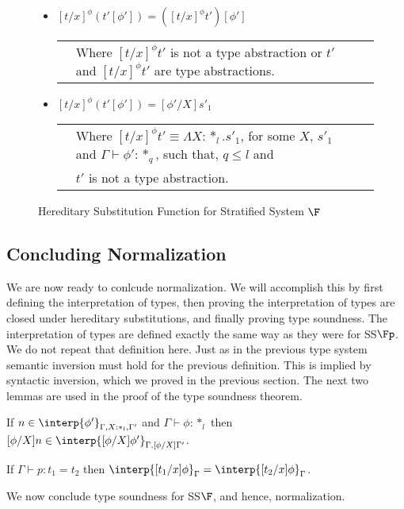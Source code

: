 \begin{figure}[t]
\begin{itemize}
  \item[] $[t/x]^\phi (t'[\phi']) = ([t/x]^\phi t')[\phi']$\\
    \begin{tabular}{lll}
      & Where $[t/x]^\phi t'$ is not a type abstraction or
      $t'$ and $[t/x]^\phi t'$ are type abstractions.
    \end{tabular}

    \item[] $[t/x]^{\phi} (t'[\phi']) = [\phi'/X]s'_1$\\
      \begin{tabular}{lll}
        & Where $[t/x]^{\phi} t' \equiv \Lambda X:*_l.s'_1$,
        for some $X$, $s'_1$ and $\Gamma \vdash \phi':*_q$, such that, $q \leq l$ and\\
	& $t'$ is not a type abstraction.
      \end{tabular}
  \end{itemize}
  \caption{Hereditary Substitution Function for Stratified System $\F$}
  \label{fig:hereditary_substitution_function_ssfe}
\end{figure}

\subsection{Concluding Normalization}
\label{subsec:concluding_normalization_ssfe}
We are now ready to conlcude normalization.  We will accomplish this
by first defining the interpretation of types, then proving the
interpretation of types are closed under hereditary substitutions, and
finally proving type soundness.  The interpretation of types are
defined exactly the same way as they were for SS$\Fp$.  We do not
repeat that definition here.  Just as in the previous type system
semantic inversion must hold for the previous definition.  This is
implied by syntactic inversion, which we proved in the previous
section.  The next two lemmas are used in the proof of the type
soundness theorem.

\begin{corollary}
  If $n \in \interp{\phi'}_{\Gamma,X:*_l,\Gamma'}$ and 
  $\Gamma \vdash \phi:*_l$ then 
  $[\phi/X]n \in \interp{[\phi/X]\phi'}_{\Gamma,[\phi/X]\Gamma'}$.
  \label{lemma:type_sub_ssfe}
\end{corollary}

\begin{lemma}
  \label{lemma:equality_of_interpretation_of_types_ssfe}
  If $\Gamma \vdash p:t_1 = t_2$ then $\interp{[t_1/x]\phi}_\Gamma = \interp{[t_2/x]\phi}_\Gamma$.
\end{lemma}
We now conclude type soundness for SS$\F$, and hence, normalization.  

